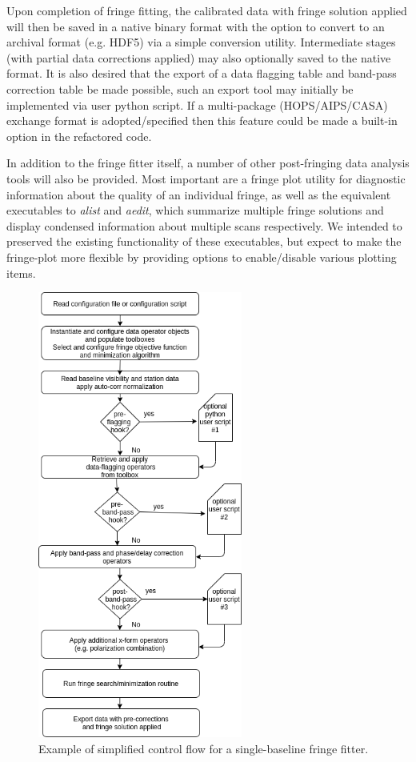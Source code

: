 Upon completion of fringe fitting, the calibrated data with fringe solution applied will then be saved in a native binary format with the option to convert to an archival format (e.g. HDF5) via a simple conversion utility. Intermediate stages (with partial data corrections applied) may also optionally saved to the native format. It is also desired that
the export of a data flagging table and band-pass correction table be made possible, such an export tool may initially be implemented via user python script. If a multi-package (HOPS/AIPS/CASA) exchange format is adopted/specified then this feature could be made a built-in option in the refactored code.

In addition to the fringe fitter itself, a number of other post-fringing data analysis tools will also be provided. Most important are
a fringe plot utility for diagnostic information about the quality of an individual fringe, as well as the equivalent executables to \textit{alist} and \textit{aedit}, which summarize multiple fringe solutions and display condensed information about multiple scans respectively.
We intended to preserved the existing functionality of these executables, but expect to make the fringe-plot more flexible by providing options
to enable/disable various plotting items.


\begin{figure}[H]
\begin{center}
  \includegraphics[width=0.6\textwidth]{fig/example-single-baseline-fringe-fitter.png}
    \caption{Example of simplified control flow for a single-baseline fringe fitter.}
    \label{fig:fringe-fitter}
\end{center}
\end{figure}


